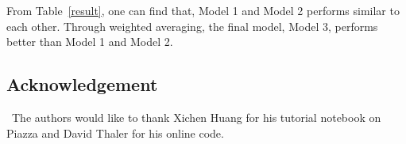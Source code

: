 \documentclass[12pt]{article}
\begin{document}
From Table~\ref{result}, one can find that, Model 1 and Model 2 performs similar to each other. Through weighted averaging, the final model, Model 3, performs better than Model 1 and Model 2.

\subsection*{Acknowledgement}

\quad\ The authors would like to thank Xichen Huang for his tutorial notebook on Piazza and David Thaler for his online code.

\vfill\pagebreak

%
\end{document}
